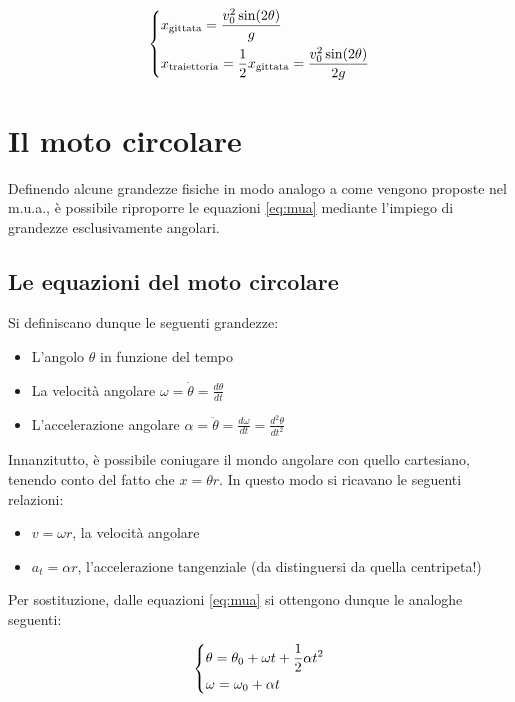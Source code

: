 \documentclass[oneside]{book}
\begin{document}
\begin{equation}
    \displaystyle
    \begin{dcases}
        x_{\text{gittata}} = \frac{v_0^2 \sin(2\theta)}{g} \\
        x_{\text{traiettoria}} = \frac12 x_{\text{gittata}} = \frac{v_0^2 \sin(2\theta)}{2g}
    \end{dcases}
\end{equation}

\section{Il moto circolare}

Definendo alcune grandezze fisiche in modo analogo a come vengono
proposte nel m.u.a., è possibile riproporre le equazioni \ref{eq:mua}
mediante l'impiego di grandezze esclusivamente angolari.

\subsection{Le equazioni del moto circolare}

Si definiscano dunque le seguenti grandezze:

\begin{itemize}
    \item L'angolo $\theta$ in funzione del tempo
    \item La velocità angolare $\displaystyle \omega=\dot{\theta}=\frac{d\theta}{dt}$
    \item L'accelerazione angolare $\displaystyle \alpha=\ddot{\theta}=\frac{d\omega}{dt}=\frac{d^2\theta}{dt^2}$
\end{itemize}

Innanzitutto, è possibile coniugare il mondo angolare con quello
cartesiano, tenendo conto del fatto che $x=\theta r$. In questo modo
si ricavano le seguenti relazioni:

\begin{itemize}
    \item $\displaystyle v=\omega r$, la velocità angolare
    \item $\displaystyle a_t=\alpha r$, l'accelerazione tangenziale
    (da distinguersi da quella centripeta!)
\end{itemize}

Per sostituzione, dalle equazioni \ref{eq:mua} si ottengono dunque
le analoghe seguenti:

\begin{equation}
    \begin{dcases}
        \theta = \theta_0 + \omega t + \frac12 \alpha t^2 \\
        \omega = \omega_0 + \alpha t
    \end{dcases}
\end{equation}
\end{document}
